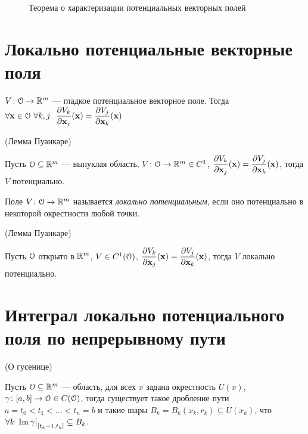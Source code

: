 \newpage

\begin{figure}[ht]
    \centering
    \caption{Теорема о характеризации потенциальных векторных полей}
\end{figure}

\section{Локально потенциальные векторные поля}

\begin{lemma}
    $V \colon \mathcal{O} \to \mathbb{R}^m$ --- гладкое потенциальное векторное поле. Тогда\\
    $\forall \mathbf{x} \in \mathcal{O}~ \forall k, j~~
    \dfrac{\partial V_k}{\partial \mathbf{x}_j}(\mathbf{x}) = \dfrac{\partial V_j}{\partial \mathbf{x}_k}(\mathbf{x})$
\end{lemma}

\begin{theorem}(Лемма Пуанкаре)

    Пусть $\mathcal{O} \subseteq \mathbb{R}^m$ --- выпуклая область, $V \colon \mathcal{O} \to \mathbb{R}^m \in C^1$,
    $\dfrac{\partial V_k}{\partial \mathbf{x}_j}(\mathbf{x}) = \dfrac{\partial V_j}{\partial \mathbf{x}_k}(\mathbf{x})$, тогда $V$ потенциально.
\end{theorem}

\begin{definition}
    Поле $V \colon \mathcal{O} \to \mathbb{R}^m$ называется \textit{локально потенциальным}, если
    оно потенциально в некоторой окрестности любой точки.
\end{definition}

\begin{corollary}(Лемма Пуанкаре)

    Пусть $\mathcal{O}$ открыто в $\mathbb{R}^m$, $V \in C^1(\mathcal{O})$, $\dfrac{\partial V_k}{\partial \mathbf{x}_j}(\mathbf{x}) =
    \dfrac{\partial V_j}{\partial \mathbf{x}_k}(\mathbf{x})$, тогда $V$ локально потенциально.
\end{corollary}

\section{Интеграл локально потенциального поля по непрерывному пути}

\begin{lemma}(О гусенице)

    Пусть $\mathcal{O} \subseteq \mathbb{R}^m$ --- область, для всех $x$ задана окрестность $U(x)$,
    $\gamma \colon [a, b] \to \mathcal{O} \in C(\mathcal{O})$, тогда существует такое дробление
    пути $a = t_0 < t_1 < \ldots < t_n = b$ и такие шары $B_k = B_k(x_k, r_k)
    \subseteq U(x_k)$, что $\forall k~ \operatorname{Im}{\gamma\big|_{[t_k - 1, t_k]}} \subseteq
    B_k$.
\end{lemma}


